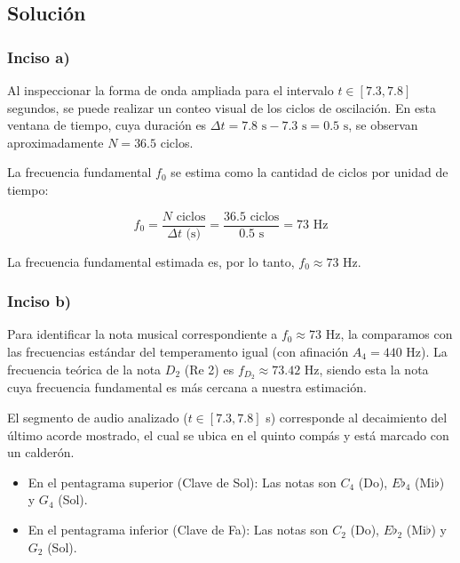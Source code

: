 \documentclass[paper=letter, fontsize=11pt, draft=false]{scrartcl}
\numberwithin{equation}{problemcounter} %
\numberwithin{figure}{problemcounter} %
\numberwithin{table}{problemcounter} %
\numberwithin{subsection}{problemcounter}
\begin{document}
\subsection{Solución}

\subsubsection{Inciso a)}

Al inspeccionar la forma de onda ampliada para el intervalo $t \in [7.3, 7.8]$ segundos, se puede realizar un conteo visual de los ciclos de oscilación. En esta ventana de tiempo, cuya duración es $\Delta t = 7.8 \text{ s} - 7.3 \text{ s} = 0.5 \text{ s}$, se observan aproximadamente $N = 36.5$ ciclos.

La frecuencia fundamental $f_0$ se estima como la cantidad de ciclos por unidad de tiempo:

\begin{equation}
    f_0 = \frac{N \text{ ciclos}}{\Delta t \text{ (s)}} = \frac{36.5 \text{ ciclos}}{0.5 \text{ s}} = 73 \text{ Hz}
\end{equation}

La frecuencia fundamental estimada es, por lo tanto, $f_0 \approx 73 \text{ Hz}$.

\subsubsection{Inciso b)}

Para identificar la nota musical correspondiente a $f_0 \approx 73 \text{ Hz}$, la comparamos con las frecuencias estándar del temperamento igual (con afinación $A_4 = 440 \text{ Hz}$). La frecuencia teórica de la nota $D_2$ (Re 2) es $f_{D_2} \approx 73.42 \text{ Hz}$, siendo esta la nota cuya frecuencia fundamental es más cercana a nuestra estimación.

El segmento de audio analizado ($t \in [7.3, 7.8]$ s) corresponde al decaimiento del último acorde mostrado, el cual se ubica en el quinto compás y está marcado con un calderón.

\begin{itemize}

\item En el pentagrama superior (Clave de Sol): Las notas son $C_4$ (Do), $E\flat_4$ (Mi$\flat$) y $G_4$ (Sol).

\item En el pentagrama inferior (Clave de Fa): Las notas son $C_2$ (Do), $E\flat_2$ (Mi$\flat$) y $G_2$ (Sol).

\end{itemize}
\end{document}
